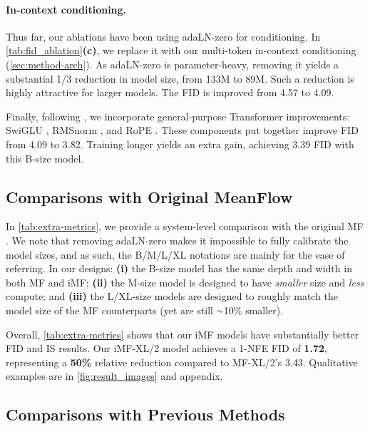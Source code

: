 

\paragraph{In-context conditioning.} 
Thus far, our ablations have been using adaLN-zero \cite{dit} for conditioning. 
In \cref{tab:fid_ablation}\textbf{(c)}, we replace it with our multi-token in-context conditioning (\cref{sec:method-arch}). As adaLN-zero is parameter-heavy, removing it yields a substantial 1/3 reduction in model size, from 133M to 89M. 
Such a reduction is highly attractive for larger models.
The FID is improved from 4.57 to 4.09.

Finally, following \cite{vavae}, we incorporate general-purpose Transformer improvements: SwiGLU \cite{swiglu}, RMSnorm \cite{rmsnorm}, and RoPE \cite{rope}. These components put together improve FID from 4.09 to 3.82.  Training longer yields an extra gain, achieving 3.39 FID with this B-size model.



\subsection{Comparisons with Original MeanFlow} 

In \cref{tab:extra-metrics}, we provide a system-level comparison with the original MF \cite{mf}. We note that removing adaLN-zero makes it impossible to fully calibrate the model sizes, and as such, the B/M/L/XL notations are mainly for the ease of referring. In our designs: \textbf{(i)} the B-size model has the same depth and width in both MF and iMF; \textbf{(ii)} the M-size model is designed to have \textit{smaller} size and \textit{less} compute; and \textbf{(iii)} the L/XL-size models are designed to roughly match the model size of the MF counterparts (yet are still $\app$10\% smaller).

Overall, \cref{tab:extra-metrics} shows that our iMF models have substantially better FID and IS results.
Our iMF-XL/2 model achieves a 1-NFE FID of \textbf{1.72}, representing a \textbf{50\%} relative reduction compared to MF-XL/2’s 3.43. Qualitative examples are in \cref{fig:result_images} and appendix.




\subsection{Comparisons with Previous Methods}  

